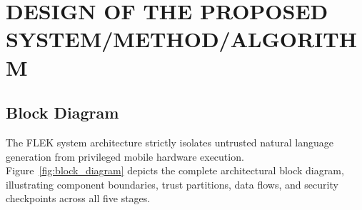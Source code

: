 \chapter{DESIGN OF THE PROPOSED SYSTEM/METHOD/ALGORITHM}

\section{Block Diagram}

The FLEK system architecture strictly isolates untrusted natural language generation from privileged mobile hardware execution. Figure~\ref{fig:block_diagram} depicts the complete architectural block diagram, illustrating component boundaries, trust partitions, data flows, and security checkpoints across all five stages.

